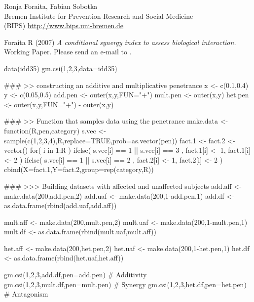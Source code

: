 \begin{Author}\relax
Ronja Foraita, Fabian Sobotka \\
Bremen Institute for Prevention Research and Social Medicine \\
(BIPS)  \url{http://www.bips.uni-bremen.de}
\end{Author}
\begin{References}\relax
Foraita R (2007)
\emph{A conditional synergy index to assess biological interaction.}
Working Paper. Please send an e-mail to .
\end{References}
\begin{SeeAlso}\relax
{}
\end{SeeAlso}
\begin{Examples}
\begin{ExampleCode}
  data(idd35)
  gm.csi(1,2,3,data=idd35)

  ### >> constructing an additive and multiplicative penetrance
  x <- c(0.1,0.4)
  y <- c(0.05,0.5)
  add.pen <- outer(x,y,FUN="+")
  mult.pen <- outer(x,y)
  het.pen <- outer(x,y,FUN="+") - outer(x,y)

  ### >> Function that samples data using the penetrance 
  make.data <- function(R,pen,category) 
    {
      s.vec <- sample(c(1,2,3,4),R,replace=TRUE,prob=as.vector(pen))
      fact.1 <- fact.2 <- vector()
      for( i in 1:R ) {
        ifelse( s.vec[i] == 1 || s.vec[i] == 3 , fact.1[i] <- 1, fact.1[i] <- 2 ) 
        ifelse( s.vec[i] == 1 || s.vec[i] == 2 , fact.2[i] <- 1, fact.2[i] <- 2 ) 
      }
      cbind(X=fact.1,Y=fact.2,group=rep(category,R))  
    }

  ### >>> Building datasets with affected and unaffected subjects   
  add.aff <- make.data(200,add.pen,2)
  add.uaf <- make.data(200,1-add.pen,1)  
  add.df <- as.data.frame(rbind(add.uaf,add.aff))
  
  mult.aff <- make.data(200,mult.pen,2)
  mult.uaf <- make.data(200,1-mult.pen,1)  
  mult.df <- as.data.frame(rbind(mult.uaf,mult.aff))
  
  het.aff <- make.data(200,het.pen,2)
  het.uaf <- make.data(200,1-het.pen,1)  
  het.df <- as.data.frame(rbind(het.uaf,het.aff))
   
  gm.csi(1,2,3,add.df,pen=add.pen)   # Additivity
  gm.csi(1,2,3,mult.df,pen=mult.pen) # Synergy
  gm.csi(1,2,3,het.df,pen=het.pen)   # Antagonism
\end{ExampleCode}
\end{Examples}

